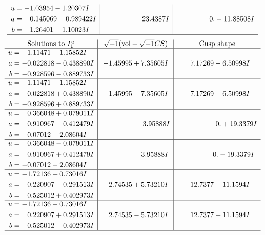\documentclass[1p]{elsarticle_modified}
\theoremstyle{definition}
\newcommand{\I}{\sqrt{-1}}
\begin{document}
$$\begin{array}{c|c|c}
\begin{aligned}
u &= -1.03954 - 1.20307 I \\
a &= -0.145069 - 0.989422 I \\
b &= -1.26401 - 1.10023 I\end{aligned}
 & \phantom{-0.000000 -}23.4387 I & \phantom{-0.000000 } 0. - 11.88508 I\\
 \hline 
 \end{array}$$\newpage$$\begin{array}{c|c|c}  
\text{Solutions to }I^u_{1}& \I (\text{vol} + \sqrt{-1}CS) & \text{Cusp shape}\\
 \hline 
\begin{aligned}
u &= \phantom{-}1.11471 + 1.15852 I \\
a &= -0.022818 - 0.438890 I \\
b &= -0.928596 - 0.889733 I\end{aligned}
 & -1.45995 + 7.35605 I & \phantom{-}7.17269 - 6.50998 I \\ \hline\begin{aligned}
u &= \phantom{-}1.11471 - 1.15852 I \\
a &= -0.022818 + 0.438890 I \\
b &= -0.928596 + 0.889733 I\end{aligned}
 & -1.45995 - 7.35605 I & \phantom{-}7.17269 + 6.50998 I \\ \hline\begin{aligned}
u &= \phantom{-}0.366048 + 0.079011 I \\
a &= \phantom{-}0.910967 - 0.412479 I \\
b &= -0.07012 + 2.08604 I\end{aligned}
 & \phantom{-0.000000 } -3.95888 I & \phantom{-0.000000 -}0. + 19.3379 I \\ \hline\begin{aligned}
u &= \phantom{-}0.366048 - 0.079011 I \\
a &= \phantom{-}0.910967 + 0.412479 I \\
b &= -0.07012 - 2.08604 I\end{aligned}
 & \phantom{-0.000000 -}3.95888 I & \phantom{-0.000000 } 0. - 19.3379 I \\ \hline\begin{aligned}
u &= -1.72136 + 0.73016 I \\
a &= \phantom{-}0.220907 - 0.291513 I \\
b &= \phantom{-}0.525012 + 0.402973 I\end{aligned}
 & \phantom{-}2.74535 + 5.73210 I & \phantom{-}12.7377 - 11.1594 I \\ \hline\begin{aligned}
u &= -1.72136 - 0.73016 I \\
a &= \phantom{-}0.220907 + 0.291513 I \\
b &= \phantom{-}0.525012 - 0.402973 I\end{aligned}
 & \phantom{-}2.74535 - 5.73210 I & \phantom{-}12.7377 + 11.1594 I\\
 \hline 
 \end{array}$$\newpage\newpage\renewcommand{\arraystretch}{1}
\end{document}
